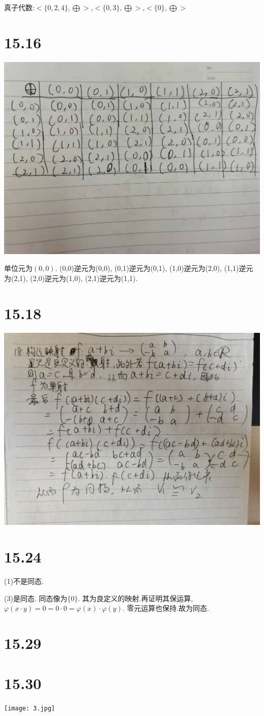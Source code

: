 \documentclass[11pt]{ctexart}
\begin{document}
真子代数:$<\{0,2,4\},\bigoplus >$,$<\{0,3\},\bigoplus>$,$<\{0\},\bigoplus>$


\section{15.16}


\includegraphics[angle=180,scale=0.2]{1.jpg}

单位元为$(0,0)$.
(0,0)逆元为(0,0),
(0,1)逆元为(0,1),
(1,0)逆元为(2,0),
(1,1)逆元为(2,1),
(2,0)逆元为(1,0),
(2,1)逆元为(1,1).


\section{15.18}

\includegraphics[scale=0.1]{2.jpg}



\section{15.24}

(1)不是同态.

(3)是同态. 同态像为$\{ 0 \}$.
其为良定义的映射.再证明其保运算,$\varphi(x\cdot y)=0=0\cdot 0=\varphi(x)\cdot \varphi(y)$.
零元运算也保持.故为同态.

\section{15.29}
\section{15.30}

\texttt{[image: 3.jpg]}
\end{document}
